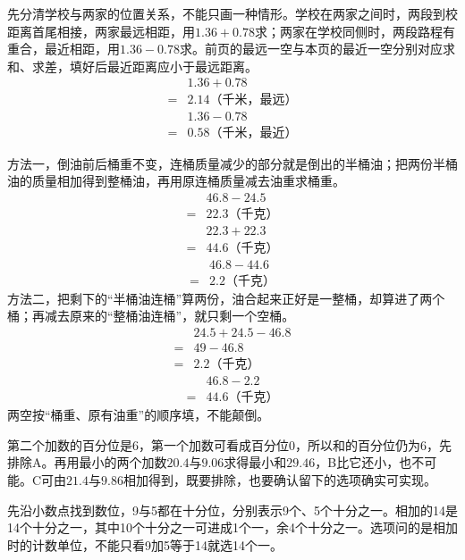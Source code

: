 \documentclass[multi=snippet,border=0pt]{standalone}
\newenvironment{snippet}[3]{\begin{minipage}{#1bp}\color{answerred}\fontsize{#2}{#3}\selectfont\raggedright}{\end{minipage}}
\begin{document}
\begin{snippet}{505}{11.5}{14}先分清学校与两家的位置关系，不能只画一种情形。学校在两家之间时，两段到校距离首尾相接，两家最远相距，用\(1.36+0.78\)求；两家在学校同侧时，两段路程有重合，最近相距，用\(1.36-0.78\)求。前页的最远一空与本页的最近一空分别对应求和、求差，填好后最近距离应小于最远距离。\[\begin{aligned}&1.36+0.78\\={}&2.14\text{（千米，最远）}\\&1.36-0.78\\={}&0.58\text{（千米，最近）}\end{aligned}\]\end{snippet}
\begin{snippet}{505}{11.5}{14}方法一，倒油前后桶重不变，连桶质量减少的部分就是倒出的半桶油；把两份半桶油的质量相加得到整桶油，再用原连桶质量减去油重求桶重。\[\begin{aligned}&46.8-24.5\\={}&22.3\text{（千克）}\end{aligned}\]\[\begin{aligned}&22.3+22.3\\={}&44.6\text{（千克）}\end{aligned}\]\[\begin{aligned}&46.8-44.6\\={}&2.2\text{（千克）}\end{aligned}\]方法二，把剩下的“半桶油连桶”算两份，油合起来正好是一整桶，却算进了两个桶；再减去原来的“整桶油连桶”，就只剩一个空桶。\[\begin{aligned}&24.5+24.5-46.8\\={}&49-46.8\\={}&2.2\text{（千克）}\end{aligned}\]\[\begin{aligned}&46.8-2.2\\={}&44.6\text{（千克）}\end{aligned}\]两空按“桶重、原有油重”的顺序填，不能颠倒。\end{snippet}
\begin{snippet}{505}{11.5}{14}第二个加数的百分位是6，第一个加数可看成百分位0，所以和的百分位仍为6，先排除A。再用最小的两个加数\(20.4\)与\(9.06\)求得最小和\(29.46\)，B比它还小，也不可能。C可由\(21.4\)与\(9.86\)相加得到，既要排除，也要确认留下的选项确实可实现。\end{snippet}
\begin{snippet}{505}{11.5}{14}先沿小数点找到数位，9与5都在十分位，分别表示9个、5个十分之一。相加的14是14个十分之一，其中10个十分之一可进成1个一，余4个十分之一。选项问的是相加时的计数单位，不能只看9加5等于14就选14个一。\end{snippet}
\end{document}
